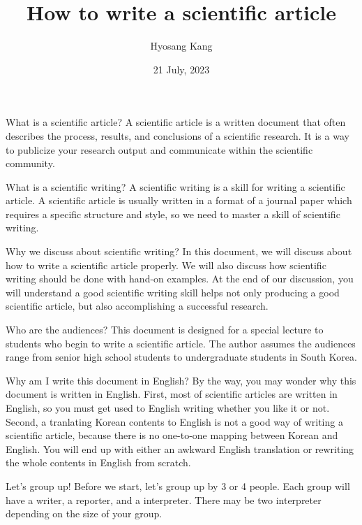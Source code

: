 \documentclass{beamer}
\title{How to write a scientific article}
\author{Hyosang Kang}
\date{21 July, 2023}
\institute{Jeonbuk Science High School}
\begin{document}
\begin{frame}
\titlepage
\end{frame}

\begin{frame}{What is a scientific article?}
A scientific article is a written document that often describes the process, results, and conclusions of a scientific research. 
It is a way to publicize your research output and communicate within the scientific community. 
\end{frame}

\begin{frame}{What is a scientific writing?}
A scientific writing is a skill for writing a scientific article.
A scientific article is usually written in a format of a journal paper which requires a specific structure and style, so we need to master a skill of scientific writing.
\end{frame}

\begin{frame}{Why we discuss about scientific writing?}
In this document, we will discuss about how to write a scientific article properly.
We will also discuss how scientific writing should be done with hand-on examples.
At the end of our discussion, you will understand a good scientific writing skill helps not only producing a good scientific article, but also accomplishing a successful research. 
\end{frame}

\begin{frame}{Who are the audiences?}
This document is designed for a special lecture to students who begin to write a scientific article.
The author assumes the audiences range from senior high school students to undergraduate students in South Korea.
\end{frame}

\begin{frame}{Why am I write this document in English?}
By the way, you may wonder why this document is written in English.
First, most of scientific articles are written in English, so you must get used to English writing whether you like it or not.
Second, a tranlating Korean contents to English is not a good way of writing a scientific article, because there is no one-to-one mapping between Korean and English. You will end up with either an awkward English translation or rewriting the whole contents in English from scratch.
\end{frame}

\begin{frame}{Let's group up!}
Before we start, let's group up by 3 or 4 people.
Each group will have a writer, a reporter, and a interpreter.
There may be two interpreter depending on the size of your group.
\end{frame}
\end{document}
